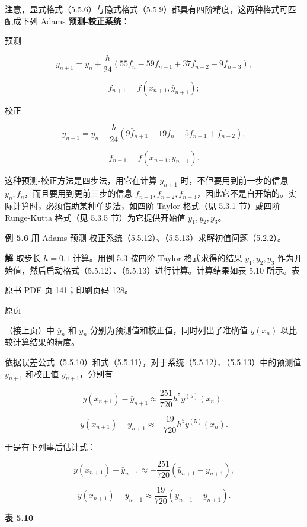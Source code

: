 注意，显式格式（5.5.6）与隐式格式（5.5.9）都具有四阶精度，这两种格式可匹配成下列 Adams \textbf{预测-校正系统}：

预测

\[
\bar y_{n+1}=y_n+\frac h{24}(55f_n-59f_{n-1}+37f_{n-2}-9f_{n-3}),
\tag{5.5.12}
\]

\[
\bar f_{n+1}=f(x_{n+1},\bar y_{n+1});
\]

校正

\[
y_{n+1}=y_n+\frac h{24}(9\bar f_{n+1}+19f_n-5f_{n-1}+f_{n-2}),
\tag{5.5.13}
\]

\[
f_{n+1}=f(x_{n+1},y_{n+1}).
\]

这种预测-校正方法是四步法，用它在计算 \(y_{n+1}\) 时，不但要用到前一步的信息 \(y_n,f_n\)，而且要用到更前三步的信息 \(f_{n-1},f_{n-2},f_{n-3}\)，因此它不是自开始的。实际计算时，必须借助某种单步法，如四阶 Taylor 格式（见 5.3.1 节）或四阶 Runge-Kutta 格式（见 5.3.5 节）为它提供开始值 \(y_1,y_2,y_3\)。

\textbf{例 5.6} 用 Adams 预测-校正系统（5.5.12）、（5.5.13）求解初值问题（5.2.2）。

\textbf{解} 取步长 \(h=0.1\) 计算。用例 5.3 按四阶 Taylor 格式求得的结果 \(y_1,y_2,y_3\) 作为开始值，然后启动格式（5.5.12）、（5.5.13）进行计算。计算结果如表 5.10 所示。表

\clearpage

原书 PDF 页 141；印刷页码 128。

\href{source-images/pdf-141.jpeg}{原页}

（接上页）中 \(\bar y_n\) 和 \(y_n\) 分别为预测值和校正值，同时列出了准确值 \(y(x_n)\) 以比较计算结果的精度。

依据误差公式（5.5.10）和式（5.5.11），对于系统（5.5.12）、（5.5.13）中的预测值 \(\bar y_{n+1}\) 和校正值 \(y_{n+1}\)，分别有

\[
y(x_{n+1})-\bar y_{n+1}\approx\frac{251}{720}h^5y^{(5)}(x_n),
\]

\[
y(x_{n+1})-y_{n+1}\approx-\frac{19}{720}h^5y^{(5)}(x_n).
\]

于是有下列事后估计式：

\[
y(x_{n+1})-\bar y_{n+1}\approx-\frac{251}{720}(\bar y_{n+1}-y_{n+1}),
\]

\[
y(x_{n+1})-y_{n+1}\approx\frac{19}{720}(\bar y_{n+1}-y_{n+1}).
\]

\textbf{表 5.10}

